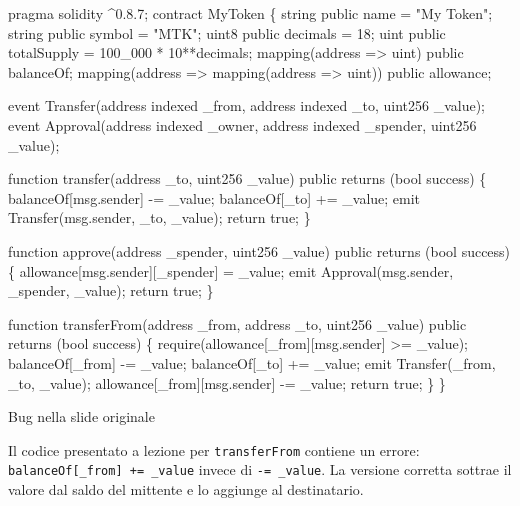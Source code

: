 \documentclass[
  italian,
  openany]{book}
\newenvironment{Shaded}{\begin{snugshade}}{\end{snugshade}}
\newcommand{\NormalTok}[1]{#1}
\begin{document}
\begin{Shaded}
\begin{Highlighting}[]
\NormalTok{pragma solidity \^{}0.8.7;}
\NormalTok{contract MyToken \{}
\NormalTok{    string public name = "My Token";}
\NormalTok{    string public symbol = "MTK";}
\NormalTok{    uint8 public decimals = 18;}
\NormalTok{    uint public totalSupply = 100\_000 * 10**decimals;}
\NormalTok{    mapping(address =\textgreater{} uint) public balanceOf;}
\NormalTok{    mapping(address =\textgreater{} mapping(address =\textgreater{} uint)) public allowance;}

\NormalTok{    event Transfer(address indexed \_from, address indexed \_to, uint256 \_value);}
\NormalTok{    event Approval(address indexed \_owner, address indexed \_spender, uint256 \_value);}

\NormalTok{    function transfer(address \_to, uint256 \_value) public returns (bool success) \{}
\NormalTok{        balanceOf[msg.sender] {-}= \_value;}
\NormalTok{        balanceOf[\_to] += \_value;}
\NormalTok{        emit Transfer(msg.sender, \_to, \_value);}
\NormalTok{        return true;}
\NormalTok{    \}}

\NormalTok{    function approve(address \_spender, uint256 \_value) public returns (bool success) \{}
\NormalTok{        allowance[msg.sender][\_spender] = \_value;}
\NormalTok{        emit Approval(msg.sender, \_spender, \_value);}
\NormalTok{        return true;}
\NormalTok{    \}}

\NormalTok{    function transferFrom(address \_from, address \_to, uint256 \_value)}
\NormalTok{            public returns (bool success) \{}
\NormalTok{        require(allowance[\_from][msg.sender] \textgreater{}= \_value);}
\NormalTok{        balanceOf[\_from] {-}= \_value;}
\NormalTok{        balanceOf[\_to] += \_value;}
\NormalTok{        emit Transfer(\_from, \_to, \_value);}
\NormalTok{        allowance[\_from][msg.sender] {-}= \_value;}
\NormalTok{        return true;}
\NormalTok{    \}}
\NormalTok{\}}
\end{Highlighting}
\end{Shaded}

\begin{calloutwarning}{Bug nella slide originale}

Il codice presentato a lezione per \texttt{transferFrom} contiene un
errore: \texttt{balanceOf{[}\_from{]}\ +=\ \_value} invece di
\texttt{-=\ \_value}. La versione corretta sottrae il valore dal saldo
del mittente e lo aggiunge al destinatario.

\end{calloutwarning}
\end{document}
